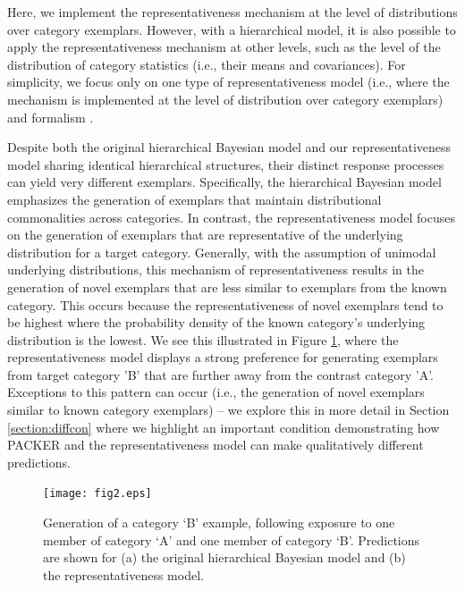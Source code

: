 \documentclass[pdflatex,sn-apa]{sn-jnl}%
\theoremstyle{thmstyleone}%
\theoremstyle{thmstyletwo}%
\theoremstyle{thmstylethree}%
\begin{document}
Here, we implement the representativeness mechanism at the level of
distributions over category exemplars. However, with a hierarchical model, it is
also possible to apply the representativeness mechanism at other levels, such as
the level of the distribution of category statistics (i.e., their means and
covariances). For simplicity, we focus only on one type of representativeness
model (i.e., where the mechanism is implemented at the level of distribution
over category exemplars) and formalism \citep[for a related formalization of representativeness, see][]{bordalo21}.

Despite both the original hierarchical Bayesian model and our representativeness
model sharing identical hierarchical structures, their distinct response
processes can yield very different exemplars. Specifically, the hierarchical
Bayesian model emphasizes the generation of exemplars that maintain
distributional commonalities across categories. In contrast, the
representativeness model focuses on the generation of exemplars that are
representative of the underlying distribution for a target category. Generally,
with the assumption of unimodal underlying distributions, this mechanism of
representativeness results in the generation of novel exemplars that are less
similar to exemplars from the known category. This occurs because the
representativeness of novel exemplars tend to be highest where the probability
density of the known category's underlying distribution is the lowest. We see
this illustrated in Figure \ref{fig:representative-examples}, where the
representativeness model displays a strong preference for generating exemplars
from target category 'B' that are further away from the contrast category 'A'.
Exceptions to this pattern can occur (i.e., the generation of novel exemplars
similar to known category exemplars) -- we explore this in more detail in Section
\ref{section:diffcon} where we highlight an important condition demonstrating
how PACKER and the representativeness model can make qualitatively different
predictions.


\begin{figure}
	\begin{center} \texttt{[image: fig2.eps]}
		\caption{Generation of a category `B' example, following exposure
to one member of category `A' and one member of category `B'. Predictions are
shown for (a) the original hierarchical Bayesian model and (b) the
representativeness model.}
		\label{fig:representative-examples}
	\end{center}
\end{figure}
\end{document}

